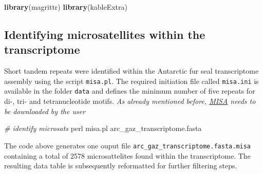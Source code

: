 \documentclass[]{article}
\newenvironment{Shaded}{\begin{snugshade}}{\end{snugshade}}
\newcommand{\KeywordTok}[1]{\textcolor[rgb]{0.13,0.29,0.53}{\textbf{#1}}}
\newcommand{\CommentTok}[1]{\textcolor[rgb]{0.56,0.35,0.01}{\textit{#1}}}
\newcommand{\FunctionTok}[1]{\textcolor[rgb]{0.00,0.00,0.00}{#1}}
\newcommand{\NormalTok}[1]{#1}
\begin{document}
\begin{Shaded}
\begin{Highlighting}[]
\KeywordTok{library}\NormalTok{(magrittr)}
\KeywordTok{library}\NormalTok{(kableExtra)}
\end{Highlighting}
\end{Shaded}

\newpage

\subsection{Identifying microsatellites within the
transcriptome}\label{identifying-microsatellites-within-the-transcriptome}

Short tandem repeats were identified within the Antarctic fur seal
transcriptome assembly using the script \texttt{misa.pl}. The required
initiation file called \texttt{misa.ini} is available in the folder
\texttt{data} and defines the minimum number of five repeats for di-,
tri- and tetranucleotide motifs. \emph{As already mentioned before,
\href{http://pgrc.ipk-gatersleben.de/misa/misa.html}{MISA} needs to be
downloaded by the user}

\begin{Shaded}
\begin{Highlighting}[]
\CommentTok{# identify microsats}
\FunctionTok{perl}\NormalTok{ misa.pl arc_gaz_transcriptome.fasta}
\end{Highlighting}
\end{Shaded}

The code above generates one ouput file
\texttt{arc\_gaz\_transcriptome.fasta.misa} containing a total of 2578
microsattelites found within the transcriptome. The resulting data table
is subsequently reformatted for further filtering steps.
\end{document}

